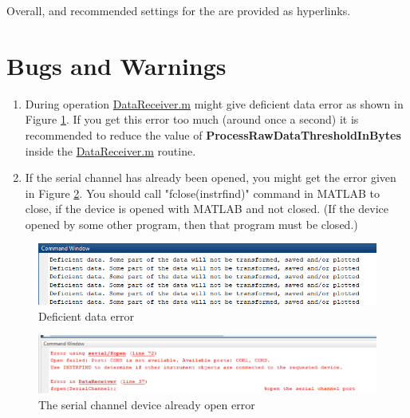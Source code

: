 \documentclass{article}
\begin{document}
Overall, \href{https://github.com/hakansrc/fault_tolerant_drives/tree/master/Software/MultipleDataPlot/ExampleProject}{} and recommended settings for the \href{https://github.com/hakansrc/fault_tolerant_drives/blob/master/Software/MultipleDataPlot/DataReceiver.m}{} are provided as hyperlinks.

\section{Bugs and Warnings}
\begin{enumerate}
	\item During operation \href{https://github.com/hakansrc/fault_tolerant_drives/blob/master/Software/MultipleDataPlot/DataReceiver.m}{DataReceiver.m} might give deficient data error as shown in Figure \ref{fig:deficientdataerror}. If you get this error too much (around once a second) it is recommended to reduce the value of \textbf{ProcessRawDataThresholdInBytes} inside the \href{https://github.com/hakansrc/fault_tolerant_drives/blob/master/Software/MultipleDataPlot/DataReceiver.m}{DataReceiver.m} routine. 
	\item If the serial channel has already been opened, you might get the error given in Figure \ref{fig:alreadyopenerror}. You should call "fclose(instrfind)" command in MATLAB to close, if the device is opened with MATLAB and not closed. (If the device opened by some other program, then that program must be closed.)
\end{enumerate}

\begin{figure}[H]
	\centering
	\includegraphics[scale=0.5]{Figures/deficientdataerror.PNG}
	\caption{Deficient data error}
	\label{fig:deficientdataerror}
\end{figure}
\begin{figure}[H]
	\centering
	\includegraphics[scale=0.5]{Figures/alreadyopen.PNG}
	\caption{The serial channel device already open error}
	\label{fig:alreadyopenerror}
\end{figure}




\end{document}
